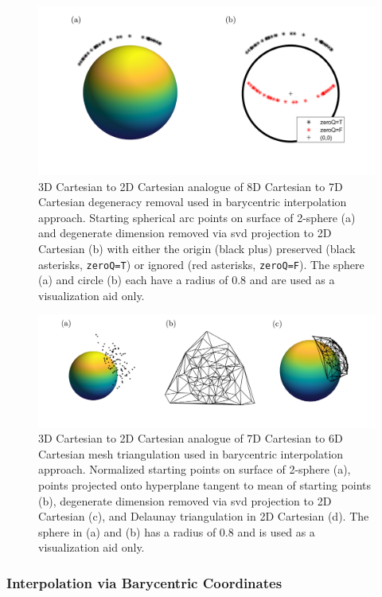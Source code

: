 \documentclass[preprint,12pt]{elsarticle}
\begin{document}
\begin{figure}
    \centering
    \includegraphics{bary-remove-deg.png}
    \caption{3D Cartesian to 2D Cartesian analogue of 8D Cartesian to 7D Cartesian degeneracy removal used in barycentric interpolation approach. Starting spherical arc points on surface of 2-sphere (a) and degenerate dimension removed via \acrlong{svd} projection to 2D Cartesian (b) with either the origin (black plus) preserved (black asterisks, \texttt{zeroQ=T}) or ignored (red asterisks, \texttt{zeroQ=F}). The sphere (a) and circle (b) each have a radius of 0.8 and are used as a visualization aid only.}
    \label{fig:bary-remove-deg}
\end{figure}

\begin{figure}
    \centering
    \includegraphics{bary-delaunay.png}
    \caption{3D Cartesian to 2D Cartesian analogue of 7D Cartesian to 6D Cartesian mesh triangulation used in barycentric interpolation approach. Normalized starting points on surface of 2-sphere (a), points projected onto hyperplane tangent to mean of starting points (b), degenerate dimension removed via \acrlong{svd} projection to 2D Cartesian (c), and Delaunay triangulation in 2D Cartesian (d). The sphere in (a) and (b) has a radius of 0.8 and is used as a visualization aid only.}
    \label{fig:bary-delaunay}
\end{figure}

\subsubsection{Interpolation via Barycentric Coordinates}
\label{sec:methods:bary:interp}
\end{document}
